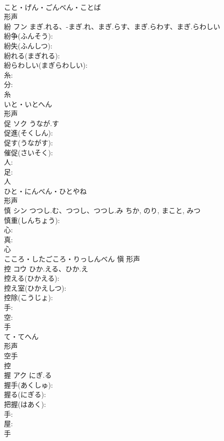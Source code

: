 \documentclass[8pt]{extreport}
\begin{document}
\begin{CJK}{UTF8}{min}
\\	こと・げん・ごんべん・ことば	
\\	形声 
\\	紛	フン	まぎ.れる、-まぎ.れ、まぎ.らす、まぎ.らわす、まぎ.らわしい		
\\	紛争(ふんそう): 
\\	紛失(ふんしつ): 
\\	紛れる(まぎれる): 
\\	紛らわしい(まぎらわしい): 
\\	糸: 
\\	分: 
\\	糸	
\\	いと・いとへん	
\\	形声 
\\	促	ソク	うなが.す		
\\	促進(そくしん): 
\\	促す(うながす): 
\\	催促(さいそく): 
\\	人: 
\\	足: 
\\	人	
\\	ひと・にんべん・ひとやね	
\\	形声 
\\	慎	シン	つつし.む、つつし、つつし.み	ちか, のり, まこと, みつ	
\\	慎重(しんちょう): 
\\	心: 
\\	真: 
\\	心	
\\	こころ・したごころ・りっしんべん	愼	形声 
\\	控	コウ	ひか.える、ひか.え		
\\	控える(ひかえる): 
\\	控え室(ひかえしつ): 
\\	控除(こうじょ): 
\\	手: 
\\	空: 
\\	手	
\\	て・てへん	
\\	形声 
\\	空手 
\\	控 
\\	握	アク	にぎ.る		
\\	握手(あくしゅ): 
\\	握る(にぎる): 
\\	把握(はあく): 
\\	手: 
\\	屋: 
\\	手	

\end{CJK}
\end{document}

